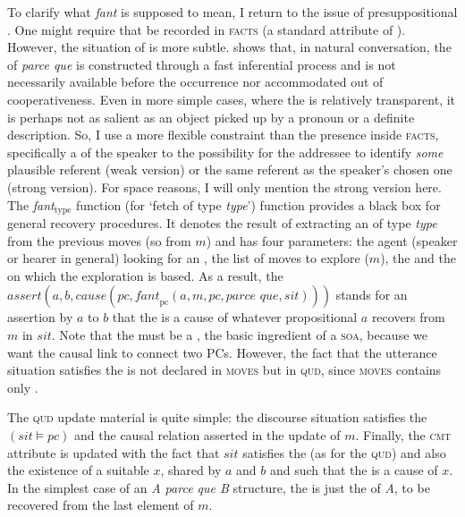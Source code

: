 \documentclass[output=paper,colorlinks,citecolor=brown]{langscibook}
\begin{document}
To clarify what \textit{fant} is supposed to mean, I return to the issue of presuppositional . One might require that  be recorded in \textsc{facts} (a standard attribute of ). However, the situation of  is more subtle. \citet{Debaisieux:2004} shows that, in natural conversation, the  of \textit{parce que} is constructed through a fast inferential process and is not necessarily available before the  occurrence nor accommodated out of cooperativeness. Even in more simple cases, where the  is relatively transparent, it is perhaps not as salient as an object picked up by a pronoun or a definite description. So, I use a more flexible constraint than the presence inside \textsc{facts}, specifically a  of the speaker to the possibility for the addressee to identify \textit{some} plausible referent (weak version) or the same referent as the speaker's chosen one (strong version). For space reasons, I will only mention the strong version here. The \textit{fant$_\text{type}$} function (for `fetch  of type \textit{type}') function provides a black box for general  recovery procedures. It denotes the result of extracting an  of type \textit{type} from the previous moves (so from $m$) and has four parameters: the agent (speaker or hearer in general) looking for an , the list of moves to explore ($m$), the  and the  on which the exploration is based.
As a result, the $\textit{assert}(a,b,cause(pc,\textit{fant}_\text{pc}(a,m,pc,\textit{parce que},sit)))$ stands for an assertion by $a$ to $b$ that the  is a cause of whatever propositional  $a$ recovers from $m$ in $sit$. Note that the  must be a , the basic ingredient of a \textsc{soa}, because we want the causal link to connect two PCs. However, the fact that the utterance situation satisfies the  is not declared in \textsc{moves} but in \textsc{qud}, since \textsc{moves} contains only .

The \textsc{qud} update material is quite simple: the discourse situation satisfies the  $(sit \models pc)$ and the causal relation asserted in the update of $m$. Finally, the \textsc{cmt} attribute is updated with the fact that $sit$ satisfies the  (as for the \textsc{qud}) and also the existence of a suitable  $x$, shared by $a$ and $b$ and such that the  is a cause of $x$. In the simplest case of an \textit{A parce que B} structure, the  is just the  of \textit{A}, to be recovered from the last element of $m$.
\end{document}
